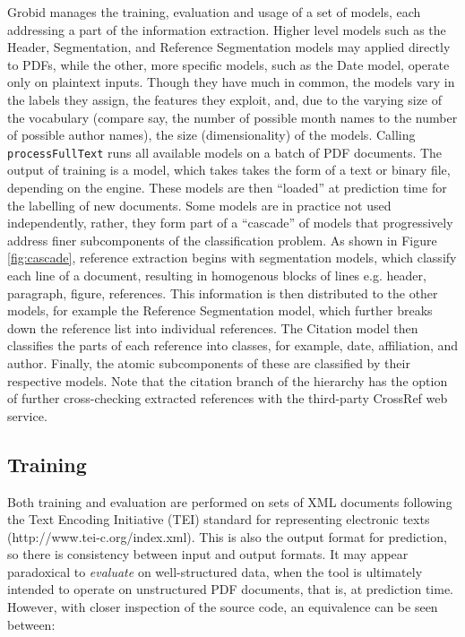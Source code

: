 \documentclass[11pt, oneside]{scrartcl}   	%
\begin{document}
Grobid manages the training, evaluation and usage of a set of models, each addressing a part of the information extraction. Higher level models such as the Header, Segmentation, and Reference Segmentation models may applied directly to PDFs, while the other, more specific models, such as the Date model, operate only on plaintext inputs. Though they have much in common, the models vary in the labels they assign, the features they exploit, and, due to the varying size of the vocabulary (compare say, the number of possible month names to the number of possible author names), the size (dimensionality) of the models. Calling \texttt{processFullText} runs all available models on a batch of PDF documents. The output of training is a model, which takes takes the form of a text or binary file, depending on the engine. These models are then ``loaded'' at prediction time for the labelling of new documents. Some models are in practice not used independently, rather, they form part of a ``cascade'' of models that progressively address finer subcomponents of the classification problem. As shown in Figure \ref{fig:cascade}, reference extraction begins with segmentation models, which classify each line of a document, resulting in homogenous blocks of lines e.g. header, paragraph, figure, references. This information is then distributed to the other models, for example the Reference Segmentation model, which further breaks down the reference list into individual references. The Citation model then classifies the parts of each reference into classes, for example, date, affiliation, and author. Finally, the atomic subcomponents of these are classified by their respective models. Note that the citation branch of the hierarchy has the option of further cross-checking extracted references with the third-party CrossRef web service.

\subsection{Training}

Both training and evaluation are performed on sets of XML documents following the Text Encoding Initiative (TEI) standard for representing electronic texts (http://www.tei-c.org/index.xml). This is also the output format for prediction, so there is consistency between input and output formats. It may appear paradoxical to \emph{evaluate} on well-structured data, when the tool is ultimately intended to operate on unstructured PDF documents, that is, at prediction time. However, with closer inspection of the source code, an equivalence can be seen between:
\end{document}
